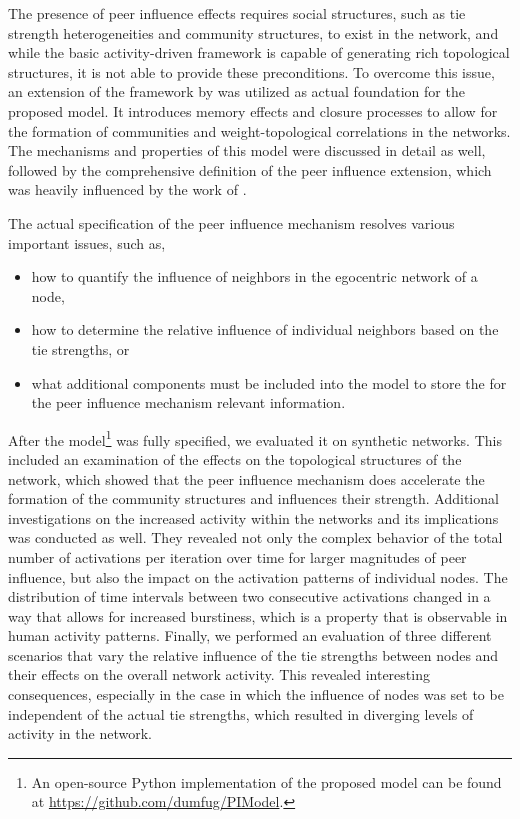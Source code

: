 The presence of peer influence effects requires social structures, such as tie strength heterogeneities and community structures, to exist in the network, and while the basic activity-driven framework is capable of generating rich topological structures, it is not able to provide these preconditions.
To overcome this issue, an extension of the framework by \citet{Laurent2015} was utilized as actual foundation for the proposed model.
It introduces memory effects and closure processes to allow for the formation of communities and weight-topological correlations in the networks.
The mechanisms and properties of this model were discussed in detail as well, followed by the comprehensive definition of the peer influence extension, which was heavily influenced by the work of \citet{Walk2016}.

The actual specification of the peer influence mechanism resolves various important issues, such as,

\begin{itemize}
    \item how to quantify the influence of neighbors in the egocentric network of a node,
    \item how to determine the relative influence of individual neighbors based on the tie strengths, or
    \item what additional components must be included into the model to store the for the peer influence mechanism relevant information.
\end{itemize}

After the model\footnote{An open-source Python implementation of the proposed model can be found at \url{https://github.com/dumfug/PIModel}.} was fully specified, we evaluated it on synthetic networks.
This included an examination of the effects on the topological structures of the network, which showed that the peer influence mechanism does accelerate the formation of the community structures and influences their strength.
Additional investigations on the increased activity within the networks and its implications was conducted as well.
They revealed not only the complex behavior of the total number of activations per iteration over time for larger magnitudes of peer influence, but also the impact on the activation patterns of individual nodes.
The distribution of time intervals between two consecutive activations changed in a way that allows for increased burstiness, which is a property that is observable in human activity patterns.
Finally, we performed an evaluation of three different scenarios that vary the relative influence of the tie strengths between nodes and their effects on the overall network activity.
This revealed interesting consequences, especially in the case in which the influence of nodes was set to be independent of the actual tie strengths, which resulted in diverging levels of activity in the network.


